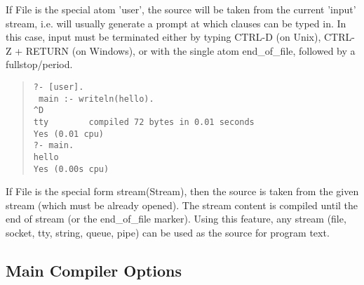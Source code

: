If File is the special atom 'user', the source will be taken from
the current 'input' stream, i.e. will usually generate a prompt
at which clauses can be typed in.  In this case, input must be
terminated either by typing CTRL-D (on Unix), CTRL-Z + RETURN
(on Windows), or with the single atom end_of_file, followed by
a fullstop/period.
\begin{quote}\begin{verbatim}
?- [user].
 main :- writeln(hello).
^D
tty        compiled 72 bytes in 0.01 seconds
Yes (0.01 cpu)
?- main.
hello
Yes (0.00s cpu)
\end{verbatim}
\end{quote}

If File is the special form stream(Stream), then the source is taken
from the given stream (which must be already opened).  The stream
content is compiled until the end of stream (or the end_of_file marker).
Using this feature, any {\eclipse} stream (file, socket, tty, string,
queue, pipe) can be used as the source for program text.


\subsection{Main Compiler Options}

